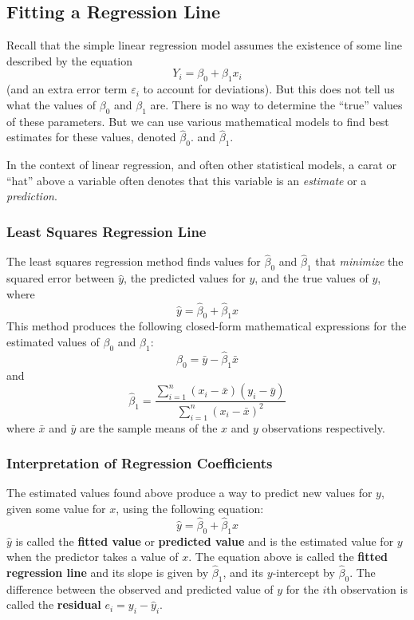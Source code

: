 \documentclass[10pt]{article}
\newenvironment{aside}{\begin{tcolorbox}[colframe=white,colback=_grey2,arc=0pt,outer arc=0pt,breakable]}{\end{tcolorbox}}
\begin{document}
\subsection{Fitting a Regression Line}
Recall that the simple linear regression model assumes the existence of some line described by the equation
$$
    Y_i=\beta_0+\beta_1x_i
$$
(and an extra error term $\varepsilon_i$ to account for deviations). But this does not tell us what the values of $\beta_0$ and $\beta_1$ are. There is no way to determine the ``true'' values of these parameters. But we can use various mathematical models to find best estimates for these values, denoted $\hat \beta_0$. and $\hat \beta_1$.
\begin{aside}
    In the context of linear regression, and often other statistical models, a carat or ``hat'' above a variable often denotes that this variable is an \textit{estimate} or a \textit{prediction}.
\end{aside}
\subsubsection{Least Squares Regression Line}
The least squares regression method finds values for $\hat \beta_0$ and $\hat \beta_1$ that \textit{minimize} the squared error between $\hat y$, the predicted values for $y$, and the true values of $y$, where
$$
    \hat y = \hat \beta_0 + \hat \beta_1 x
$$
This method produces the following closed-form mathematical expressions for the estimated values of $\beta_0$ and $\beta_1$:
$$
    \hat \beta_0=\bar y - \hat \beta_1 \bar x
$$
and
$$
    \hat \beta_1 = \frac{\displaystyle\sum_{i=1}^n(x_i-\bar x)(y_i-\bar y)}{\displaystyle\sum_{i=1}^n (x_i-\bar x)^2}
$$
where $\bar x$ and $\bar y$ are the sample means of the $x$ and $y$ observations respectively.
\subsubsection{Interpretation of Regression Coefficients}
The estimated values found above produce a way to predict new values for $y$, given some value for $x$, using the following equation:
$$
    \hat y = \hat \beta_0 + \hat \beta_1 x
$$
$\hat y$ is called the \textbf{fitted value} or \textbf{predicted value} and is the estimated value for $y$ when the predictor takes a value of $x$. The equation above is called the \textbf{fitted regression line} and its slope is given by $\hat \beta_1$, and its $y$-intercept by $\hat \beta_0$. The difference between the observed and predicted value of $y$ for the $i$th observation is called the \textbf{residual} $e_i=y_i-\hat y_i$.
\end{document}

